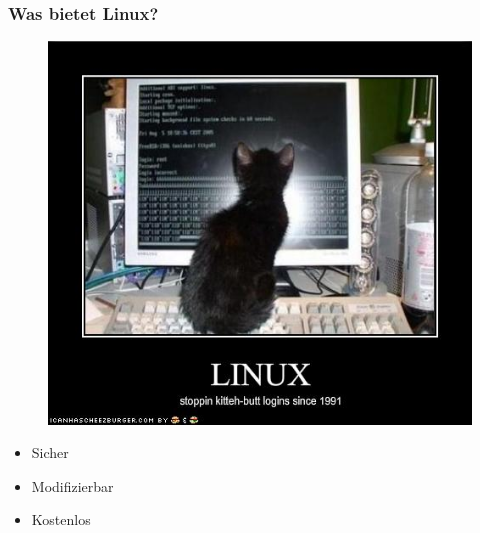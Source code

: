 \begin{frame}
\frametitle{Was bietet Linux?}
\begin{figure}
\includegraphics[scale=0.33]{resources/kitteh.jpg}
\end{figure}
\begin{itemize}
	\item Sicher
	\item Modifizierbar
	\item Kostenlos
\end{itemize}
\end{frame}

